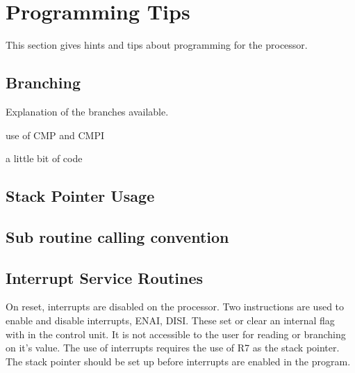 
\section{Programming Tips}
{}



This section gives hints and tips about programming for the \samurai{} processor. 

\subsection{Branching}

Explanation of the branches available.

use of CMP and CMPI

a little bit of code


\subsection{Stack Pointer Usage}



\subsection{Sub routine calling convention}


\subsection{Interrupt Service Routines}

On reset, interrupts are disabled on the \samurai{} processor.
Two instructions are used to enable and disable interrupts, ENAI, DISI.
These set or clear an internal flag with in the control unit. 
It is not accessible to the user for reading or branching on it's value.
The use of interrupts requires the use of R7 as the stack pointer. 
The stack pointer should be set up before interrupts are enabled in the program.


